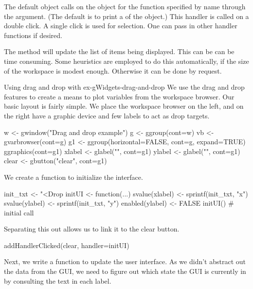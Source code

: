 The default  object calls
 on the object for the function specified by name
through the  argument. (The default is
to print a  of the object.) This handler is called on a
double click. A single click is used for selection. One can pass in
other handler functions if desired.  


The  method will update the list of items
being displayed.  This can be can be time consuming. Some heuristics
are employed to do this automatically, if the size of the workspace is
modest enough. Otherwise it can be done by request.

\begin{example}{Using drag and drop with }{ex-gWidgets-drag-and-drop}
  We use the drag and drop features to create a means to plot
  variables from the workspace browser.  Our basic layout is fairly
  simple. We place the workspace browser on the left, and on the right
  have a graphic device and few labels to act as drop targets.
\begin{Schunk}
\begin{Sinput}
 w <- gwindow("Drag and drop example")
 g <- ggroup(cont=w)
 vb <- gvarbrowser(cont=g)
 g1 <- ggroup(horizontal=FALSE, cont=g, expand=TRUE)
 ggraphics(cont=g1)
 xlabel <- glabel("", cont=g1)
 ylabel <- glabel("", cont=g1)
 clear <- gbutton("clear", cont=g1)
\end{Sinput}
\end{Schunk}
%
We create a function to initialize the interface.
\begin{Schunk}
\begin{Sinput}
 init_txt <- "<Drop %
 initUI <- function(...) {
   svalue(xlabel) <- sprintf(init_txt, "x")
   svalue(ylabel) <- sprintf(init_txt, "y")
   enabled(ylabel) <- FALSE
 }
 initUI()                                # initial call
\end{Sinput}
\end{Schunk}
%
Separating this out allows us to link it to the clear button.
\begin{Schunk}
\begin{Sinput}
 addHandlerClicked(clear, handler=initUI)
\end{Sinput}
\end{Schunk}
%
Next, we write a function to update the user interface. As we didn't
abstract out the data from the GUI,
we need to figure out which state the GUI is currently in by
consulting the text in each label.

\end{example}
